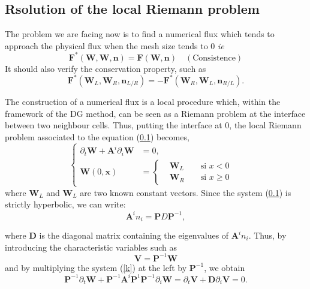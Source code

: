 \documentclass[a4paper,oneside,10pt]{report}
\begin{document}
\subsection{Rsolution of the local Riemann problem}
The problem we are facing now is to find a numerical flux which tends to approach the physical flux when the mesh size tends to 0 \textit{ie}
\begin{equation}
\mathbf{F}^*(\mathbf{W},\mathbf{W},\mathbf{n}) = \mathbf{F }(\mathbf{W},\mathbf{n}) \quad (\mbox{Consistence})
\end{equation}
It should also verify the conservation property, such as
\begin{equation}
\mathbf{F}^*(\mathbf{W}_L,\mathbf{W}_R,\mathbf{n}_{L/R}) = -\mathbf{F}^*(\mathbf{W}_R,\mathbf{W}_L,\mathbf{n}_{R/L}).
\end{equation}

The construction of a numerical flux is a local procedure which, within the framework of the DG method, can be seen as a Riemann problem at the interface between two neighbour cells. Thus, putting the interface at 0, the local Riemann problem associated to the equation (\ref{}) becomes,
\begin{equation}
\label{Riem}
\left\{
\begin{aligned}
\partial_t \mathbf{W} + \mathbf{A}^i \partial_i \mathbf{W} &= 0,\\
\mathbf{W}(0,\mathbf{x}) &= \left\{
\begin{aligned}
&\mathbf{W}_L& &\mbox{ si } x < 0&\\
&\mathbf{W}_R& &\mbox{ si } x \geq 0&
\end{aligned}
\right.
\end{aligned}
\right.
\end{equation}
where $\mathbf{W}_L$ and $\mathbf{W}_L$ are two known constant vectors. Since the system (\ref{})  is strictly hyperbolic, we can write:
\begin{equation}
\mathbf{A}^i n_i=\mathbf{P}D\mathbf{P}^{-1},
\end{equation}

where $\mathbf{D}$ is the diagonal matrix containing the eigenvalues of $\mathbf{A}^i n_i$. Thus, by introducing the characteristic variables such as
\begin{equation}
\mathbf{V} = \mathbf{P}^{-1}\mathbf{W}
\end{equation}
and by multiplying the system (\ref{k}) at the left by $\mathbf{P}^{-1}$, we obtain
\begin{equation}
\mathbf{P}^{-1} \partial_t \mathbf{W} + \mathbf{P}^{-1} \mathbf{A}^i \mathbf{P}^{1}\mathbf{P}^{-1}   \partial_i \mathbf{W} = \partial_t \mathbf{V} + \mathbf{D} \partial_i \mathbf{V}  = 0.
\end{equation}
\end{document}
